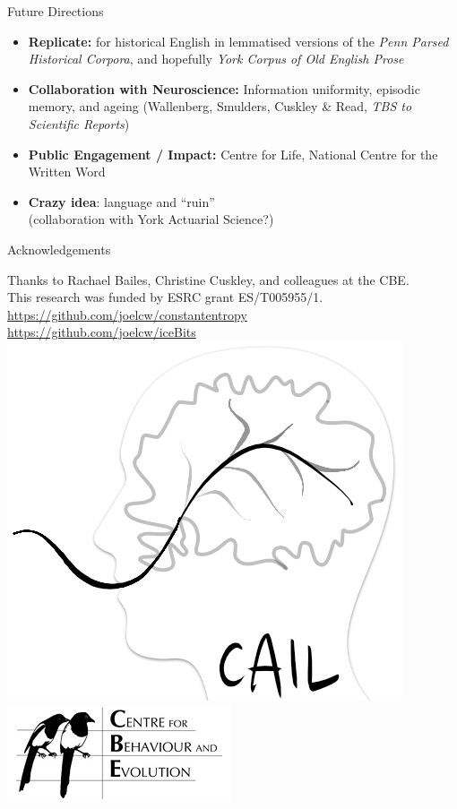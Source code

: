 \documentclass[hyperref={pdfpagelabels=false}]{beamer}
\begin{document}
\begin{frame}{Future Directions} 
	
	
	\begin{itemize}
		\item \textbf{Replicate:} for historical English in lemmatised versions of the \textsl{Penn Parsed Historical Corpora}, and hopefully \textsl{York Corpus of Old English Prose} \citep{ycoe}\pause
		\item \textbf{Collaboration with Neuroscience:} Information uniformity, episodic memory, and ageing (Wallenberg, Smulders, Cuskley \& Read, \textsl{TBS to Scientific Reports})\pause
	\item \textbf{Public Engagement / Impact:} Centre for Life, National Centre for the Written Word\pause
		\item \textbf{Crazy idea}: language and ``ruin''\\ (collaboration with York Actuarial Science?)
	\end{itemize}
	
\end{frame}

\begin{frame}{Acknowledgements}
	\begin{center}
		
		Thanks to Rachael Bailes, Christine Cuskley, and colleagues at the CBE.\\This research was funded by ESRC grant ES/T005955/1.
		\url{https://github.com/joelcw/constantentropy}\\
		\url{https://github.com/joelcw/iceBits}\\\vspace{3mm}
		\includegraphics[scale = 0.2]{caillogo.png}
		\includegraphics[scale = 0.4]{CBElogo.jpg}
	\end{center}
\end{frame}
\end{document}
